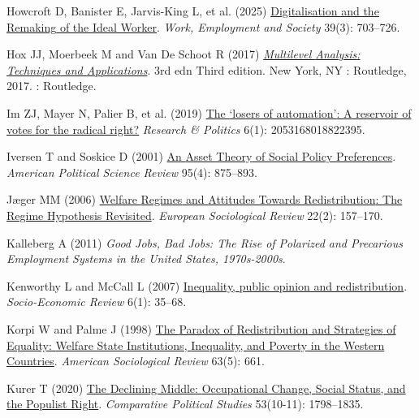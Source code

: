 \documentclass[
  12pt,
]{article}
\newlength{\cslhangindent}
\newenvironment{CSLReferences}[2] %
 {\begin{list}{}{%
  \setlength{\itemindent}{0pt}
  \setlength{\leftmargin}{0pt}
  \setlength{\parsep}{0pt}
  \ifodd #1
   \setlength{\leftmargin}{\cslhangindent}
   \setlength{\itemindent}{-1\cslhangindent}
  \fi
  \setlength{\itemsep}{#2\baselineskip}}}
 {\end{list}}
\begin{document}
\begin{CSLReferences}{1}{1}
Howcroft D, Banister E, Jarvis-King L, et al. (2025)
\href{https://doi.org/10.1177/09500170241301015}{Digitalisation and the
{Remaking} of the {Ideal Worker}}. \emph{Work, Employment and Society}
39(3): 703--726.

Hox JJ, Moerbeek M and Van De Schoot R (2017)
\emph{\href{https://doi.org/10.4324/9781315650982}{Multilevel
{Analysis}: {Techniques} and {Applications}}}. 3rd edn Third edition.
\textbar{} New York, NY : Routledge, 2017. \textbar: Routledge.

Im ZJ, Mayer N, Palier B, et al. (2019)
\href{https://doi.org/10.1177/2053168018822395}{The {`losers of
automation'}: {A} reservoir of votes for the radical right?}
\emph{Research \& Politics} 6(1): 2053168018822395.

Iversen T and Soskice D (2001)
\href{https://doi.org/10.1017/S0003055400400079}{An {Asset Theory} of
{Social Policy Preferences}}. \emph{American Political Science Review}
95(4): 875--893.

Jæger MM (2006) \href{https://doi.org/10.1093/esr/jci049}{Welfare
{Regimes} and {Attitudes Towards Redistribution}: {The Regime Hypothesis
Revisited}}. \emph{European Sociological Review} 22(2): 157--170.

Kalleberg A (2011) \emph{Good Jobs, Bad Jobs: {The} Rise of Polarized
and Precarious Employment Systems in the {United States}, 1970s-2000s}.

Kenworthy L and McCall L (2007)
\href{https://doi.org/10.1093/ser/mwm006}{Inequality, public opinion and
redistribution}. \emph{Socio-Economic Review} 6(1): 35--68.

Korpi W and Palme J (1998) \href{https://doi.org/10.2307/2657333}{The
{Paradox} of {Redistribution} and {Strategies} of {Equality}: {Welfare
State Institutions}, {Inequality}, and {Poverty} in the {Western
Countries}}. \emph{American Sociological Review} 63(5): 661.

Kurer T (2020) \href{https://doi.org/10.1177/0010414020912283}{The
{Declining Middle}: {Occupational Change}, {Social Status}, and the
{Populist Right}}. \emph{Comparative Political Studies} 53(10-11):
1798--1835.


\end{CSLReferences}
\end{document}
